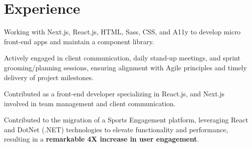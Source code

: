 \documentclass[letterpaper]{deedy-resume} %
\begin{document}
\hfill
%
%
\begin{minipage}[t]{0.66\textwidth} %


\section{Experience}


\vspace{\topsep} %
\begin{tightitemize}
\item Working with Next.js, React.js, HTML, Sass, CSS, and A11y to develop micro front-end apps and maintain a component library.
\item Actively engaged in client communication, daily stand-up meetings, and sprint grooming/planning sessions, ensuring alignment with Agile principles and timely delivery of project milestones.
\end{tightitemize}

\sectionspace %


\begin{tightitemize}
\item Contributed as a front-end developer specializing in React.js, and Next.js involved in team management and client communication.
\item  Contributed to the migration of a Sports Engagement platform, leveraging React and DotNet (.NET) technologies to elevate functionality and performance,
resulting in a \textbf{remarkable 4X increase in user engagement}.
\end{tightitemize}

\sectionspace %




\end{minipage}
\end{document}
